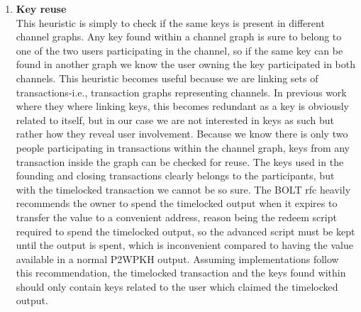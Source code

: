 \begin{enumerate}

    \item \textbf{Key reuse}\\
This heuristic is simply to check if the same keys is present in different channel graphs.  
Any key found within a channel graph is sure to belong to one of the two users participating in the channel, so if the same key can be found in another graph we know the user owning the key participated in both channels.
This heuristic becomes useful because we are linking sets of transactions-i.e., transaction graphs representing channels. In previous work where they where linking keys, this becomes redundant as a key is obviously related to itself, but in our case we are not interested in keys as such but rather how they reveal user involvement. Because we know there is only two people participating in transactions within the channel graph, keys from any transaction inside the graph can be checked for reuse. The keys used in the founding and closing transactions clearly belongs to the participants, but with the timelocked transaction we cannot be so sure. The BOLT rfc \cite{bolt5} heavily recommends the owner to spend the timelocked output when it expires to transfer the value to a convenient address, reason being the redeem script required to spend the timelocked output, so the advanced script must be kept until the output is spent, which is inconvenient compared to having the value available in a normal P2WPKH output.
Assuming implementations follow this recommendation, the timelocked transaction and the keys found within should only contain keys related to the user which claimed the timelocked output. 
\\


\end{enumerate}
